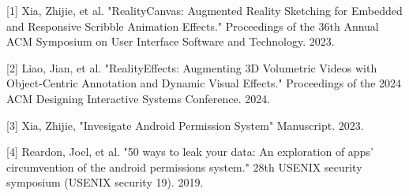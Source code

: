 \documentclass{article}
\begin{document}





\vspace{0.125in}



[1] Xia, Zhijie, et al. "RealityCanvas: Augmented Reality Sketching for Embedded and Responsive Scribble Animation Effects." Proceedings of the 36th Annual ACM Symposium on User Interface Software and Technology. 2023.

[2] Liao, Jian, et al. "RealityEffects: Augmenting 3D Volumetric Videos with Object-Centric Annotation and Dynamic Visual Effects." Proceedings of the 2024 ACM Designing Interactive Systems Conference. 2024.

[3] Xia, Zhijie, "Invesigate Android Permission System" Manuscript. 2023.

[4] Reardon, Joel, et al. "50 ways to leak your data: An exploration of apps' circumvention of the android permissions system." 28th USENIX security symposium (USENIX security 19). 2019.
\end{document}

